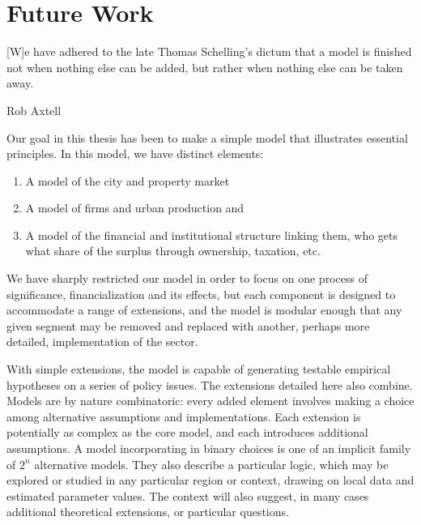 \chapter[Future Work]{Future Work} \label{appendix-future-work}

\epigraph{[W]e have adhered to the late Thomas Schelling’s dictum that a model is finished not when nothing else can be added, but rather when nothing else can be taken away.}{Rob Axtell \cite{axtellDynamicsFirmsData2024}}

Our goal in this thesis has been to make a simple model that illustrates essential principles. %
In this model, we have distinct elements: 
\begin{enumerate}
    \item A model of the city and property market
    \item A model of firms and urban production and
    \item A model of the financial and institutional structure linking them, who gets what share of the surplus through ownership, taxation, etc.
\end{enumerate}

We have sharply restricted our model in order to focus on one process of significance, financialization and its effects, but each component is designed  to accommodate a range of extensions, and the model is modular enough that any given segment may be removed and replaced with another, perhaps more detailed, implementation of the sector.



With simple extensions, the model is capable of generating testable empirical hypotheses on a series of policy issues. The extensions detailed here also combine. Models are by nature combinatoric: every added element involves making a choice among alternative assumptions and implementations. Each extension is potentially as complex as the core model, and each introduces additional assumptions.  A model incorporating in binary choices is one of an implicit family of $2^n$ alternative models. 
They also describe a particular logic, which may be explored or studied in any particular region or context, drawing on local data and estimated parameter values. The context will also suggest, in many cases additional theoretical extensions, or particular questions.


